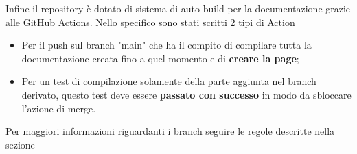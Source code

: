         Infine il repository è dotato di sistema di auto-build per la documentazione grazie alle GitHub Actions. Nello specifico sono stati scritti 2 tipi di Action
        \begin{itemize}
            \item Per il push sul branch "main" che ha il compito di compilare tutta la documentazione creata fino a quel momento e di \textbf{creare la page};
            \item Per un test di compilazione solamente della parte aggiunta nel branch derivato, questo test deve essere \textbf{passato con successo} in modo da sbloccare l'azione di merge.
        \end{itemize}
        Per maggiori informazioni riguardanti i branch seguire le regole descritte nella sezione 

